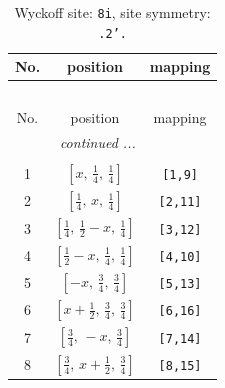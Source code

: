 \documentclass[fleqn,8pt]{jsarticle}
\begin{document}
\begin{longtable}{ccc}
\caption{Wyckoff site: {\tt 8i}, site symmetry: {\tt .2'.}}
 \\
 \hline \hline
No. & position & mapping \\ \hline \endfirsthead

\multicolumn{2}{l}{\tablename\ \thetable{}} \\
 \hline \hline
No. & position & mapping \\ \hline \endhead

 \hline \hline
\multicolumn{2}{r}{\footnotesize\it continued ...} \\ \endfoot

 \hline \hline
\multicolumn{2}{r}{} \\ \endlastfoot

1 & $\left[ x,\, \frac{1}{4},\, \frac{1}{4} \right]$ & {\tt [1,9]} \\ \hline
2 & $\left[ \frac{1}{4},\, x,\, \frac{1}{4} \right]$ & {\tt [2,11]} \\ \hline
3 & $\left[ \frac{1}{4},\, \frac{1}{2} - x,\, \frac{1}{4} \right]$ & {\tt [3,12]} \\ \hline
4 & $\left[ \frac{1}{2} - x,\, \frac{1}{4},\, \frac{1}{4} \right]$ & {\tt [4,10]} \\ \hline
5 & $\left[ - x,\, \frac{3}{4},\, \frac{3}{4} \right]$ & {\tt [5,13]} \\ \hline
6 & $\left[ x + \frac{1}{2},\, \frac{3}{4},\, \frac{3}{4} \right]$ & {\tt [6,16]} \\ \hline
7 & $\left[ \frac{3}{4},\, - x,\, \frac{3}{4} \right]$ & {\tt [7,14]} \\ \hline
8 & $\left[ \frac{3}{4},\, x + \frac{1}{2},\, \frac{3}{4} \right]$ & {\tt [8,15]} \\
\end{longtable}
\renewcommand{\arraystretch}{1.2}
\end{document}
